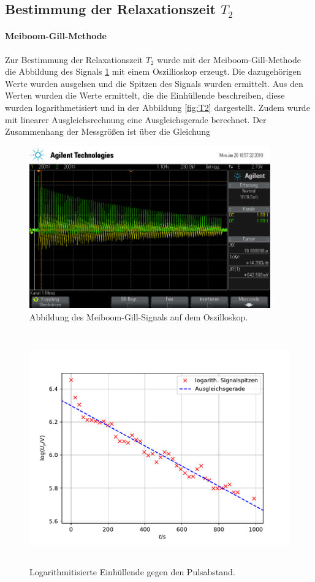 \subsection{Bestimmung der Relaxationszeit \texorpdfstring{$T_2$}{math}}
\paragraph{Meiboom-Gill-Methode} Zur Bestimmung der Relaxationszeit $T_2$ wurde mit der Meiboom-Gill-Methode die 
Abbildung des Signals \ref{fig:MGMO} mit einem Oszillioskop erzeugt. Die dazugehörigen Werte wurden ausgelsen und die 
Spitzen des Signals wurden ermittelt. Aus den Werten wurden die Werte ermittelt, die die Einhüllende beschreiben, diese 
wurden logarithmetisiert und in der Abbildung \ref{fig:T2} dargestellt. Zudem wurde mit linearer Ausgleichsrechnung eine 
Ausgleichsgerade berechnet. Der Zusammenhang der Messgrößen ist über die Gleichung 

\begin{figure}
  \centering
  \includegraphics[height = 7cm]{plots/scope_1.png}
  \caption{Abbildung des Meiboom-Gill-Signals auf dem Oszilloskop.}
  \label{fig:MGMO}
\end{figure}
\begin{figure}
  \centering
  \includegraphics[height = 10cm]{plots/T2plot.pdf}
  \caption{Logarithmitisierte Einhüllende gegen den Pulsabstand.}
  \label{fig:plot}
\end{figure}



